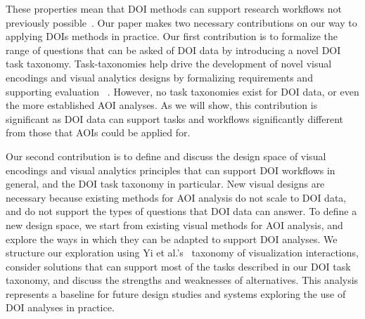 These properties mean that DOI methods can support research workflows not previously possible~\cite{alam15analyzing, sundstedt2013visual, bernhard2014gaze}. Our paper makes two necessary contributions on our way to applying DOIs methods in practice. 
Our first contribution is to formalize the range of questions that can be asked of DOI data by introducing a novel DOI task taxonomy. Task-taxonomies help drive the development of novel visual encodings and visual analytics designs by formalizing requirements and supporting evaluation ~\cite{amar2005low,okoe2015graphunit}. However, no task taxonomies exist for DOI data, or even the more established AOI analyses. As we will show, this contribution is significant as DOI data can support tasks and workflows significantly different from those that AOIs could be applied for.

Our second contribution is to define and discuss the design space of visual encodings and visual analytics principles that can support DOI workflows in general, and the DOI task taxonomy in particular. New visual designs are necessary because existing methods for AOI analysis do not scale to DOI data, and do not support the types of questions that DOI data can answer. To define a new design space, we start from existing visual methods for AOI analysis, and explore the ways in which they can be adapted to support DOI analyses. We structure our exploration using Yi et al.'s~\cite{yi2007toward} taxonomy of visualization interactions, consider solutions that can support most of the tasks described in our DOI task taxonomy, and discuss the strengths and weaknesses of alternatives.  This analysis represents a baseline for future design studies and systems exploring the use of DOI analyses in practice.


